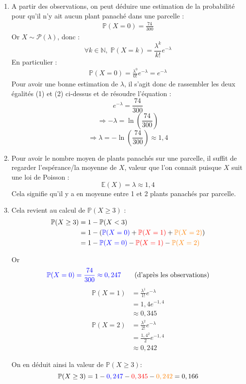 \documentclass[a4paper,oneside,12pt]{article}
\theoremstyle{plain}
\def\N{{\mathbb N}}
\def\P{{\mathbb P}}
\def\E{{\mathbb E}}
\begin{document}
\begin{enumerate}
    \item A partir des observations, on peut déduire une estimation de la probabilité pour qu'il n'y ait aucun plant panaché dans une parcelle : 
    \begin{align}
        \P(X = 0) = \frac{74}{300}
    \end{align}
    Or $X\sim \mathcal{P}(\lambda)$, donc :
    $$\forall k\in \N,\; \P(X=k) = \frac{\lambda^k}{k!}e^{-\lambda}$$
    En particulier :
    \begin{align}
        \P(X=0) = \frac{\lambda^0}{0!}e^{-\lambda}= e^{-\lambda}
    \end{align}
    Pour avoir une bonne estimation de $\lambda$, il s'agit donc de rassembler les deux égalités (1) et (2) ci-dessus et de résoudre l'équation :
    $$e^{-\lambda} = \frac{74}{300}$$
    $$\Rightarrow -\lambda = \ln\left(\frac{74}{300}\right)$$
    $$\Rightarrow \lambda = -\ln\left(\frac{74}{300}\right) \approx 1,4$$
    
    \item Pour avoir le nombre moyen de plants panachés sur une parcelle, il suffit de regarder l'espérance/la moyenne de $X$, valeur que l'on connait puisque $X$ suit une loi de Poisson :
    $$\E(X) = \lambda \approx 1,4$$
    Cela signifie qu'il y a en moyenne entre 1 et 2 plants panachés par parcelle.
    
    \item Cela revient au calcul de $\P(X\ge 3)$ :
    \begin{align*}
        \P(X\ge 3) &= 1 - \P(X< 3) \\
        &= 1 - (\color{blue}\P(X= 0) \color{black}+ \color{red}\P(X= 1)\color{black} + \color{orange}\P(X= 2)\color{black}) \\
        &=1 - \color{blue}\P(X= 0) \color{black}- \color{red}\P(X= 1)\color{black} - \color{orange}\P(X= 2)\color{black}
    \end{align*}
    
    Or 
    \begin{align*}
        \color{blue}\P(X= 0) = \frac{74}{300}\approx 0,247\color{black} \qquad \mbox{(d'après les observations)} 
    \end{align*} \color{red}
    \begin{align*}
        \P(X= 1) &= \frac{\lambda^1}{1!}e^{-\lambda} \\
        &=1,4 e^{-1,4} \\
        &\approx 0,345 
    \end{align*} \color{orange}
    \begin{align*}
        \P(X= 2) &= \frac{\lambda^2}{2!}e^{-\lambda} \\
        &=\frac{1,4^2}{2} e^{-1,4} \\
        &\approx 0,242
    \end{align*}\color{black}

    On en déduit ainsi la valeur de $\P(X\ge 3)$:
    $$\P(X\ge 3) = 1 - \color{blue}0,247\color{black} -\color{red} 0,345 \color{black}- \color{orange}0,242\color{black} = 0,166$$
\end{enumerate}
\end{document}
